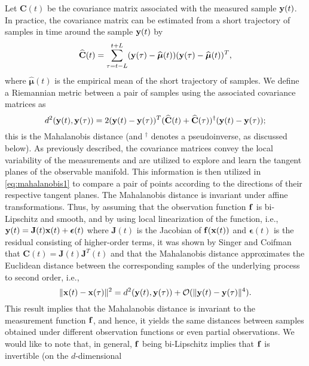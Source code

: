 Let $\mathbf{C}(t)$ be the covariance matrix associated with the measured sample $\mathbf{y}(t)$. In practice, the covariance matrix can be estimated from a short trajectory of samples in time around the sample $\mathbf{y}(t)$ by
\begin{equation}
	\widehat{\mathbf{C}}(t) = \sum \limits _{\tau = t-L}^{t+L} (\mathbf{y}(\tau) - \widehat{\boldsymbol{\mu}}(t))(\mathbf{y}(\tau) - \widehat{\boldsymbol{\mu}}(t))^T,
	\label{eq:cov}
\end{equation}
where $\widehat{\boldsymbol{\mu}}(t)$ is the empirical mean of the short trajectory of samples.
%
We define a Riemannian metric between a pair of samples using the associated covariance matrices as
\begin{equation}
	d^2(\mathbf{y}(t), \mathbf{y}(\tau)) = 2 (\mathbf{y}(t) - \mathbf{y}(\tau))^T(\widehat{\mathbf{C}}(t) + \widehat{\mathbf{C}}(\tau))^{\dagger}(\mathbf{y}(t) - \mathbf{y}(\tau));
	\label{eq:mahalanobis1}
\end{equation}
this is the Mahalanobis distance (and $^{\dagger}$ denotes a pseudoinverse, as discussed below).
%
As previously described, the covariance matrices convey the local variability of the measurements and are utilized to explore and learn the tangent planes of the observable manifold.
%
This information is then utilized in \eqref{eq:mahalanobis1} to compare a pair of points according to the directions of their respective tangent planes.
%
The Mahalanobis distance is invariant under affine transformations.
%
Thus, by assuming that the observation function $\mathbf{f}$ is bi-Lipschitz and smooth, and by using local linearization of the function, i.e., $\mathbf{y}(t) = \mathbf{J}(t) \mathbf{x}(t) + \boldsymbol{\epsilon}(t)$ where $\mathbf{J}(t)$ is the Jacobian of $\mathbf{f}(\mathbf{x}(t))$ and $\boldsymbol{\epsilon}(t)$ is the residual consisting of higher-order terms, it was shown by Singer and Coifman \cite{singer2008non} that $\mathbf{C}(t) = \mathbf{J}(t)\mathbf{J}^T(t)$ and that the Mahalanobis distance approximates the Euclidean distance between the corresponding samples of the underlying process to second order, i.e.,
\begin{equation}
	\| \mathbf{x}(t) - \mathbf{x}(\tau) \|^2 = d^2(\mathbf{y}(t), \mathbf{y}(\tau)) + \mathcal{O}(\| \mathbf{y}(t) - \mathbf{y}(\tau)\|^4).
\end{equation}
%
This result implies that the Mahalanobis distance is invariant to the measurement function $\mathbf{f}$, and hence,
it yields the same distances between samples obtained under different observation functions or even partial observations.
%
We would like to note that, in general, $\mathbf{f}$ being bi-Lipschitz implies that $\mathbf{f}$ is invertible (on the $d$-dimensional
